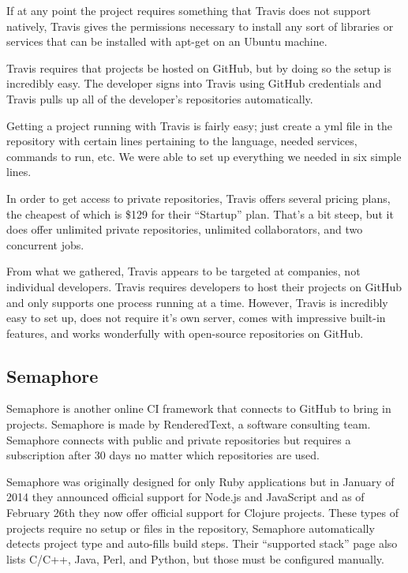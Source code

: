 \documentclass[12pt]{ucthesis}
\begin{document}
If at any point the project requires something that Travis does not support natively, Travis gives the permissions necessary to install any sort of libraries or services that can be installed with apt-get on an Ubuntu machine.

Travis requires that projects be hosted on GitHub, but by doing so the setup is incredibly easy. The developer signs into Travis using GitHub credentials and Travis pulls up all of the developer's repositories automatically. 

Getting a project running with Travis is fairly easy; just create a yml file in the repository with certain lines pertaining to the language, needed services, commands to run, etc. We were able to set up everything we needed in six simple lines.

In order to get access to private repositories, Travis offers several pricing plans, the cheapest of which is \$129 \cite{TravisPricing} for their ``Startup'' plan. That's a bit steep, but it does offer unlimited private repositories, unlimited collaborators, and two concurrent jobs. 

From what we gathered, Travis appears to be targeted at companies, not individual developers. Travis requires developers to host their projects on GitHub and only supports one process running at a time. However, Travis is incredibly easy to set up, does not require it's own server, comes with impressive built-in features, and works wonderfully with open-source repositories on GitHub.

\subsection{Semaphore}
Semaphore\cite{Semaphore} is another online CI framework that connects to GitHub to bring in projects. Semaphore is made by RenderedText, a software consulting team. Semaphore connects with public and private repositories but requires a subscription after 30 days no matter which repositories are used.

Semaphore was originally designed for only Ruby applications but in January of 2014 they announced official support for Node.js and JavaScript and as of February 26th they now offer official support for Clojure projects.\cite{SemaphoreBlog} These types of projects require no setup or files in the repository, Semaphore automatically detects project type and auto-fills build steps. Their ``supported stack'' page also lists C/C++, Java, Perl, and Python, but those must be configured manually. 
\end{document}
